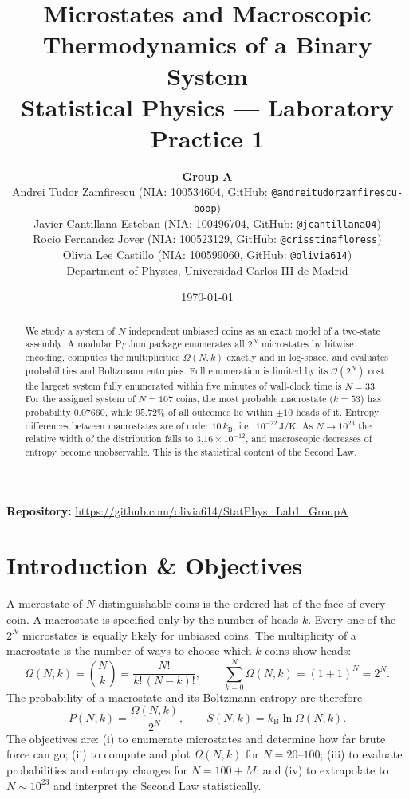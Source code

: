 \documentclass[11pt, a4paper]{article}
\title{\textbf{Microstates and Macroscopic Thermodynamics of a Binary System}\\
\large Statistical Physics --- Laboratory Practice 1}
\author{\textbf{Group A}\\[0.5em]
Andrei Tudor Zamfirescu (NIA: 100534604, GitHub: \texttt{@andreitudorzamfirescu-boop})\\
Javier Cantillana Esteban (NIA: 100496704, GitHub: \texttt{@jcantillana04})\\
Rocio Fernandez Jover (NIA: 100523129, GitHub: \texttt{@crisstinafloress})\\
Olivia Lee Castillo (NIA: 100599060, GitHub: \texttt{@olivia614})\\[0.6em]
\small Department of Physics, Universidad Carlos III de Madrid}
\date{\today}
\newcommand{\kB}{k_{\mathrm{B}}}
\begin{document}
\maketitle

\begin{abstract}
\noindent We study a system of $N$ independent unbiased coins as an exact model of a two-state assembly. A modular Python package enumerates all $2^N$ microstates by bitwise encoding, computes the multiplicities $\Omega(N,k)$ exactly and in log-space, and evaluates probabilities and Boltzmann entropies. Full enumeration is limited by its $\mathcal{O}(2^N)$ cost: the largest system fully enumerated within five minutes of wall-clock time is $N=33$. For the assigned system of $N=107$ coins, the most probable macrostate ($k=53$) has probability $0.07660$, while $95.72\%$ of all outcomes lie within $\pm 10$ heads of it. Entropy differences between macrostates are of order $10\,\kB$, i.e.\ $10^{-22}\,\mathrm{J/K}$. As $N\to 10^{23}$ the relative width of the distribution falls to $3.16\times 10^{-12}$, and macroscopic decreases of entropy become unobservable. This is the statistical content of the Second Law.
\end{abstract}

\vspace{0.4em}
\noindent \textbf{Repository:} \url{https://github.com/olivia614/StatPhys_Lab1_GroupA}

\vspace{0.8em}

\section{Introduction \& Objectives}
A microstate of $N$ distinguishable coins is the ordered list of the face of every coin. A macrostate is specified only by the number of heads $k$. Every one of the $2^N$ microstates is equally likely for unbiased coins. The multiplicity of a macrostate is the number of ways to choose which $k$ coins show heads:
\begin{equation}
\Omega(N,k) = \binom{N}{k} = \frac{N!}{k!\,(N-k)!}, \qquad \sum_{k=0}^{N}\Omega(N,k)=(1+1)^N = 2^N .
\label{eq:omega}
\end{equation}
The probability of a macrostate and its Boltzmann entropy are therefore
\begin{equation}
P(N,k) = \frac{\Omega(N,k)}{2^{N}}, \qquad S(N,k) = \kB \ln \Omega(N,k).
\label{eq:PS}
\end{equation}
The objectives are: (i) to enumerate microstates and determine how far brute force can go; (ii) to compute and plot $\Omega(N,k)$ for $N=20$--$100$; (iii) to evaluate probabilities and entropy changes for $N=100+M$; and (iv) to extrapolate to $N\sim10^{23}$ and interpret the Second Law statistically.
\end{document}
